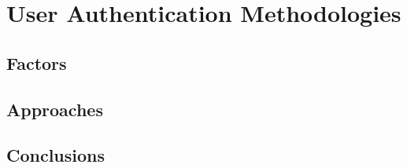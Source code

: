 \section{User Authentication Methodologies}


\subsection{Factors}



\subsection{Approaches}


\subsection{Conclusions}

